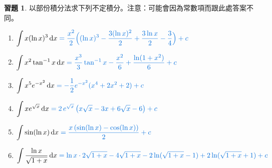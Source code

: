 \documentclass[12pt]{extarticle}
\newcommand{\ds}{\displaystyle}
\theoremstyle{definition}
\newtheorem*{exe}{習題}
\begin{document}
\begin{exe} 以部份積分法求下列不定積分。注意：可能會因為常數項而跟此處答案不同。
  \begin{enumerate}\setlength\itemsep{0em}
    \item $\ds\int x(\ln x)^3\,\mathrm{d}x {\color{C2}\;= \frac{x^2}{2}\Big((\ln x)^3 -\frac{3(\ln x)^2}{2} + \frac{3\ln x}{2} - \frac{3}{4} \Big) + c}$
    \item $\ds\int x^2\tan^{-1} x\,\mathrm{d}x {\color{C2}\;= \frac{x^3}{3}\tan^{-1} x - \frac{x^2}{6} + \frac{\ln(1 + x^2)}{6} + c}$
    \item $\ds\int x^5 e^{-x^2}\,\mathrm{d}x {\color{C2}\;= -\frac{1}{2}e^{-x^2}(x^4 + 2x^2 + 2) + c}$
    \item $\ds\int x e^{\sqrt{x}}\,\mathrm{d}x {\color{C2}\;= 2\,e^{\sqrt{x}}\,\big(x\sqrt{x} - 3x + 6\sqrt{x} - 6\big) + c}$
    \item $\ds\int\sin(\ln x)\,\mathrm{d}x {\color{C2}\;= \frac{x\,(\sin(\ln x) - \cos(\ln x))}{2} + c}$
    \item $\ds\int\frac{\ln x}{\sqrt{1 + x}}\,\mathrm{d}x {\color{C2}\;= \ln x\cdot 2\sqrt{1 + x} - 4\sqrt{1+x} - 2\ln(\sqrt{1 + x}-1) + 2\ln(\sqrt{1+x} + 1) + c}$
  \end{enumerate}
\end{exe}
\end{document}
